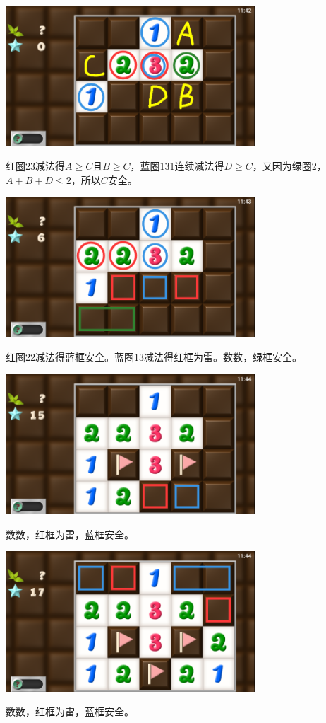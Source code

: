 \subsection{} %
\begin{center}
    \includegraphics[width=0.7\textwidth]{puzzle/168-1.png}
\end{center}
红圈23减法得$A\ge C$且$B\ge C$，蓝圈131连续减法得$D\ge C$，又因为绿圈2，$A+B+D\le 2$，所以$C$安全。
\begin{center}
    \includegraphics[width=0.7\textwidth]{puzzle/168-2.png}
\end{center}
红圈22减法得蓝框安全。蓝圈13减法得红框为雷。数数，绿框安全。
\begin{center}
    \includegraphics[width=0.7\textwidth]{puzzle/168-3.png}
\end{center}
数数，红框为雷，蓝框安全。
\begin{center}
    \includegraphics[width=0.7\textwidth]{puzzle/168-4.png}
\end{center}
数数，红框为雷，蓝框安全。

